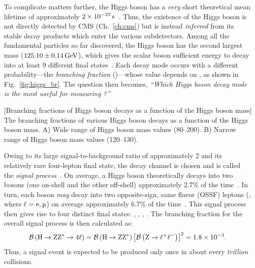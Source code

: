 To complicate matters further, the Higgs boson has a \emph{very} short theoretical mean lifetime of approximately $2 \times \text{10}^\text{$-$22}\,\text{s}$~\cite{CMS-PAS-HIG-21-013}.
Thus, the existence of the Higgs boson is not directly detected by CMS (Ch.~\ref{ch:cms}) but is instead \emph{inferred} from its stable decay products which enter the various subdetectors.
Among all the fundamental particles so far discovered, the Higgs boson has the second largest mass ($125.10 \pm 0.14\,\text{Ge\hspace{-.08em}V}$), which gives the scalar boson sufficient energy to decay into at least 9 different final states~\cite{particle_data_group_review_2020}.
Each decay mode occurs with a different probability---the \emph{branching fraction} (\br)---whose value depends on \mH, as shown in Fig.~\ref{fig:higgs_br}.
The question then becomes, \emph{``Which Higgs boson decay mode is the most useful for measuring \mH?''}
\begin{multiFigure}
	\centering
		[Branching fractions of Higgs boson decays as a function of the Higgs boson mass]
		{The branching fractions of various Higgs boson decays as a function of the Higgs boson mass.
		\;A) Wide range of Higgs boson mass values (80--200\GeV).
		\;B) Narrow range of Higgs boson mass values (120--130\GeV).}
	\label{fig:higgs_br}
\end{multiFigure} 

Owing to its large signal-to-background ratio of approximately 2 and its relatively rare four-lepton final state, the \hzzfourl decay channel is chosen and is called the \emph{signal process}~\cite{HIG_19_001}.
On average, a Higgs boson theoretically decays into two \PZ bosons (one on-shell and the other off-shell) approximately 2.7\% of the time~\cite{ATLAS:2022vkf}.
In turn, each \PZ boson \emph{may} decay into two opposite-sign, same flavor (OSSF) leptons (\ztolplm, where $\ell = \Pe, \Pmu$) on average approximately 6.7\% of the time~\cite{particle_data_group_review_2020}.
This signal process then gives rise to four distinct final states: \foure, \fourmu, \twoetwomu, \twomutwoe.
The branching fraction for the overall signal process is then calculated as: %
\begin{equation*}
    \mathcal{B} \left( \mathrm{H} \to \text{Z}\text{Z}^{\ast} \to 4\ell \right) = \mathcal{B} \left( \mathrm{H} \to \text{Z}\text{Z}^{\ast} \right) \left[ \mathcal{B} \left( \text{Z} \to \ell^+ \ell^- \right) \right]^2 = 1.8 \times \text{10}^\text{$-$3}.
\end{equation*}
Thus, a signal event is expected to be produced only once in about every \emph{trillion} \pp collisions.

